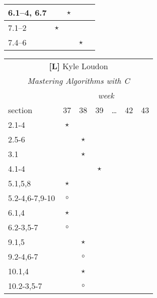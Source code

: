 \documentclass[a4paper]{article}
\newcommand{\refl}{\textbf{[L]}\xspace}
\begin{document}
\begin{table}
\begin{minipage}[t]{0.5\columnwidth}
\begin{tabular}{|l|c|c|c|c|}
    \hline
    6.1--4, 6.7        &         & $\star$ &         & \\
    \hline
    7.1--2             & $\star$ &         &         & \\
    7.4--6             &         &         & $\star$ & \\
    \hline
  \end{tabular}
  \end{minipage}
  \hfill
  \begin{minipage}[t]{0.5\columnwidth}
  \begin{tabular}{|l|c|c|c|c|c|c|}
    \hline
    \multicolumn{7}{|c|}{\refl Kyle Loudon} \\
    \multicolumn{7}{|c|}{\emph{Mastering Algorithms with C}} \\
    \hline
                       & \multicolumn{6}{|c|}{\emph{week}} \\
    section            & 37      & 38      & 39      & \ldots  & 42      & 43      \\
    \hline
    2.1-4              & $\star$ &         &         &         &         &         \\
    2.5-6              &         & $\star$ &         &         &         &         \\
    \hline
    3.1                &         & $\star$ &         &         &         &         \\
    \hline
    4.1-4              &         &         & $\star$ &         &         &         \\
    \hline
    5.1,5,8            & $\star$ &         &         &         &         &         \\
    5.2-4,6-7,9-10     & $\circ$ &         &         &         &         &         \\
    \hline
    6.1,4              & $\star$ &         &         &         &         &         \\
    6.2-3,5-7          & $\circ$ &         &         &         &         &         \\
    \hline
    9.1,5              &         & $\star$ &         &         &         &         \\
    9.2-4,6-7          &         & $\circ$ &         &         &         &         \\
    \hline
    10.1,4             &         & $\star$ &         &         &         &         \\
    10.2-3,5-7         &         & $\circ$ &         &         &         &         \\

\end{tabular}
\end{minipage}
\end{table}
\end{document}
